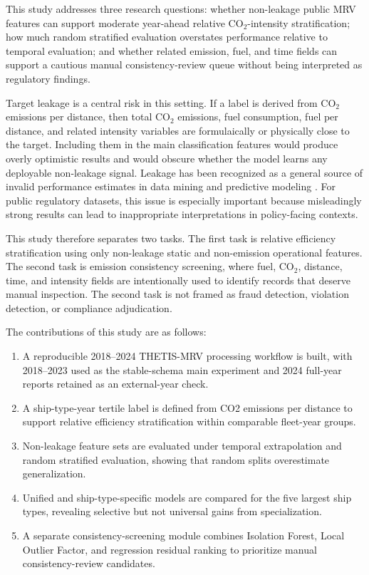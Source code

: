 \documentclass[preprints,article,submit,pdftex,oneauthor]{Definitions/mdpi}
\begin{document}
This study addresses three research questions: whether non-leakage public MRV features can support moderate year-ahead relative CO$_2$-intensity stratification; how much random stratified evaluation overstates performance relative to temporal evaluation; and whether related emission, fuel, and time fields can support a cautious manual consistency-review queue without being interpreted as regulatory findings.

Target leakage is a central risk in this setting. If a label is derived from CO$_2$ emissions per distance, then total CO$_2$ emissions, fuel consumption, fuel per distance, and related intensity variables are formulaically or physically close to the target. Including them in the main classification features would produce overly optimistic results and would obscure whether the model learns any deployable non-leakage signal. Leakage has been recognized as a general source of invalid performance estimates in data mining and predictive modeling \cite{kaufman2012leakage}. For public regulatory datasets, this issue is especially important because misleadingly strong results can lead to inappropriate interpretations in policy-facing contexts.

This study therefore separates two tasks. The first task is relative efficiency stratification using only non-leakage static and non-emission operational features. The second task is emission consistency screening, where fuel, CO$_2$, distance, time, and intensity fields are intentionally used to identify records that deserve manual inspection. The second task is not framed as fraud detection, violation detection, or compliance adjudication.

The contributions of this study are as follows:
\begin{enumerate}
\item A reproducible 2018--2024 THETIS-MRV processing workflow is built, with 2018--2023 used as the stable-schema main experiment and 2024 full-year reports retained as an external-year check.
\item A ship-type-year tertile label is defined from CO2 emissions per distance to support relative efficiency stratification within comparable fleet-year groups.
\item Non-leakage feature sets are evaluated under temporal extrapolation and random stratified evaluation, showing that random splits overestimate generalization.
\item Unified and ship-type-specific models are compared for the five largest ship types, revealing selective but not universal gains from specialization.
\item A separate consistency-screening module combines Isolation Forest, Local Outlier Factor, and regression residual ranking to prioritize manual consistency-review candidates.
\end{enumerate}
\end{document}
